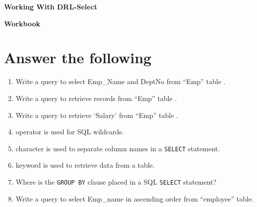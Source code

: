 \documentclass[11pt,a4paper]{article}
\begin{document}
\centerline{\huge{ \textbf{Working With DRL-Select}}}

\vspace{1pc}

\centerline{\Large{ \textbf{Workbook}}}
\section*{Answer the following}
\begin{enumerate}\itemsep10pt
\item Write a query to select Emp\_Name and DeptNo from ``Emp'' table \underline{\hspace{3cm}}.

\item Write a query to retrieve records from ``Emp'' table \underline{\hspace{3cm}}.

\item Write a query to retrieve `Salary' from ``Emp'' table \underline{\hspace{3cm}}.

\item \underline{\hspace{3cm}} operator is used for SQL wildcards.

\item \underline{\hspace{3cm}} character is used to separate column names in a \texttt{SELECT} statement.

\item \underline{\hspace{3cm}} keyword is used to retrieve data from a table.

\item Where is the \texttt{GROUP BY} clause placed in a SQL \texttt{SELECT} statement?\underline{\hspace{3cm}}

\item Write a query to select Emp\_name in ascending order from ``employee'' table.



\end{enumerate}
\end{document}
